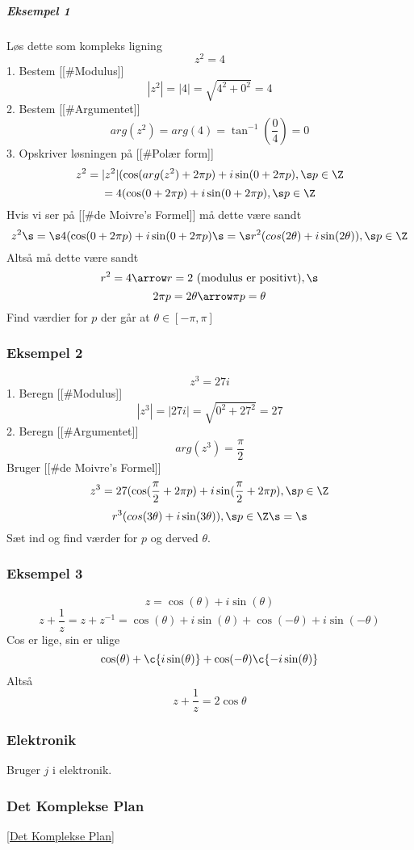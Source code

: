 \hypertarget{eksempel-1}{%
\subparagraph{Eksempel 1}\label{eksempel-1}}

Løs dette som kompleks ligning \[z^2 = 4\] 1. Bestem
{[}{[}\#Modulus{]}{]} \[|z^2| = |4| = \sqrt{4^2 + 0^2} = 4\] 2. Bestem
{[}{[}\#Argumentet{]}{]}
\[arg(z^2) = arg(4) = \tan^{-1}\left(\frac{0}{4}\right) = 0\] 3.
Opskriver løsningen på {[}{[}\#Polær form{]}{]}
\[z^2 = |z^2| (\cos(arg(z^2) + 2\pi p) + i\sin(0+2\pi p), \s p \in \Z\]
\[= 4(\cos(0 + 2\pi p) + i\sin(0+2\pi p), \s p \in \Z\] Hvis vi ser på
{[}{[}\#de Moivre's Formel{]}{]} må dette være sandt
\[z^2 \s=\s4(\cos(0 + 2\pi p) + i\sin(0+2\pi p) \s=\s r^2 (cos(2\theta) + i \sin(2\theta)), \s p \in \Z\]
Altså må dette være sandt
\[r^2 = 4 \arrow r = 2 \text{ (modulus er positivt)}, \s\]
\[2\pi p = 2\theta \arrow \pi p = \theta\] Find værdier for \(p\) der
går at \(\theta \in [-\pi, \pi]\)

\hypertarget{eksempel-2}{%
\subsubsection{Eksempel 2}\label{eksempel-2}}

\[z^3 = 27i\] 1. Beregn {[}{[}\#Modulus{]}{]}
\[|z^3| = |27i| = \sqrt{0^2+27^2} = 27\] 2. Beregn
{[}{[}\#Argumentet{]}{]} \[arg(z^3) = \frac{\pi}{2}\] Bruger {[}{[}\#de
Moivre's Formel{]}{]}
\[z^3 = 27(\cos(\frac{\pi}{2} + 2\pi p) + i\sin(\frac{\pi}{2} +2\pi p), \s p \in \Z\]
\[r^3 (cos(3\theta) + i \sin(3\theta)), \s p \in \Z \s=\s \] Sæt ind og
find værder for \(p\) og derved \(\theta\).

\hypertarget{eksempel-3}{%
\subsubsection{Eksempel 3}\label{eksempel-3}}

\[z = \cos(\theta) + i\sin(\theta)\]
\[z + \frac{1}{z} = z + z^{-1} = \cos(\theta) + {i\sin(\theta)} + \cos({-\theta}) + i\sin(-\theta) \]
Cos er lige, sin er ulige
\[\cos(\theta) + \c{i\sin(\theta)} + \cos({-\theta}) \c{- i\sin(\theta)} \]
Altså \[z + \frac{1}{z} = 2\cos{\theta}\]

\hypertarget{elektronik}{%
\subsubsection{Elektronik}\label{elektronik}}

Bruger \(j\) i elektronik.

\hypertarget{det-komplekse-plan}{%
\subsubsection{Det Komplekse Plan}\label{det-komplekse-plan}}

{[}\protect\hyperlink{det-komplekse-plan}{Det Komplekse Plan}{]}
